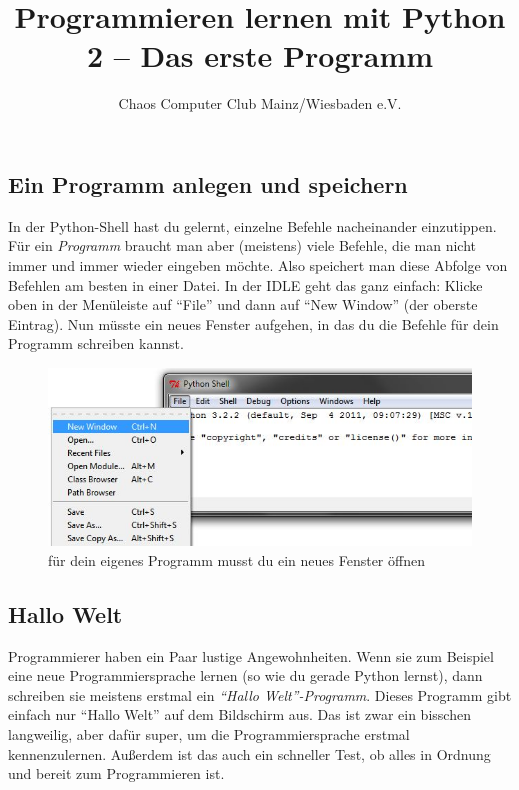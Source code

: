 



	\title{Programmieren lernen mit Python\\2 – Das erste Programm}
	\author{Chaos Computer Club Mainz/Wiesbaden e.V.}
	\maketitle
	
	\subsection*{Ein Programm anlegen und speichern}
	In der Python-Shell hast du gelernt, einzelne Befehle nacheinander einzutippen. Für ein \emph{Programm} braucht man aber (meistens) viele Befehle, die man nicht immer und immer wieder eingeben möchte. Also speichert man diese Abfolge von Befehlen am besten in einer Datei. In der IDLE geht das ganz einfach: Klicke oben in der Menüleiste auf \enquote{File} und dann auf \enquote{New Window} (der oberste Eintrag). Nun müsste ein neues Fenster aufgehen, in das du die Befehle für dein Programm schreiben kannst.
	
	\begin{figure}[htbp]
		\centering
		\includegraphics[width=1\textwidth]{img/new.jpg}
		\caption{für dein eigenes Programm musst du ein neues Fenster öffnen}
		\label{new}
	\end{figure}
	
	\subsection*{Hallo Welt}
	Programmierer haben ein Paar lustige Angewohnheiten. Wenn sie zum Beispiel eine neue Programmiersprache lernen (so wie du gerade Python lernst), dann schreiben sie meistens erstmal ein \emph{\enquote{Hallo Welt}-Programm}. Dieses Programm gibt einfach nur \enquote{Hallo Welt} auf dem Bildschirm aus. Das ist zwar ein bisschen langweilig, aber dafür super, um die Programmiersprache erstmal kennenzulernen. Außerdem ist das auch ein schneller Test, ob alles in Ordnung und bereit zum Programmieren ist.
	
